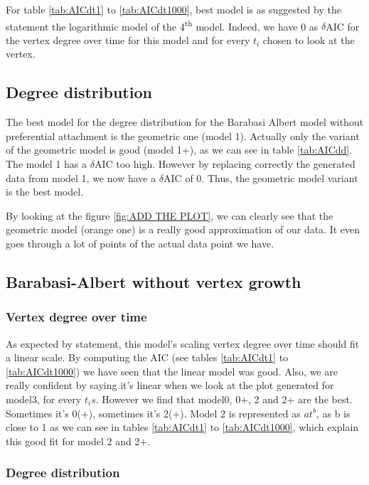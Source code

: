 \documentclass{article}
\begin{document}
For table \ref{tab:AICdt1} to \ref{tab:AICdt1000}, best model is as suggested by
the statement the logarithmic model of the 4\textsuperscript{th} model. Indeed,
we have 0 as $\delta$AIC for the vertex degree over time for this model and for every
$t_i$ chosen to look at the vertex.


\subsection{Degree distribution}


The best model for the degree distribution for the Barabasi Albert model without
preferential attachment is the geometric one (model 1). Actually only the
variant of the geometric model is good (model 1+), as we can see in table
\ref{tab:AICdd}. The model 1 has a $\delta$AIC too high. However by replacing
correctly the generated data from model 1, we now have a $\delta$AIC of 0.
Thus, the geometric model variant is the best model.

By looking at the figure \ref{fig:ADD THE PLOT}, we can clearly see that
the geometric model (orange one)
is a really good approximation of our data. It even goes through a lot of
points of the actual data point we have.



\subsection{Barabasi-Albert without vertex growth}

\subsubsection{Vertex degree over time}

As expected by statement, this model's scaling vertex degree over time should
fit a linear scale. By computing the AIC (see tables \ref{tab:AICdt1} to
\ref{tab:AICdt1000}) we have seen that the linear model was good. Also, we are
really confident by saying it's linear when we look at the plot generated for
model3, for every $t_is$. However we find that model0, 0+, 2 and 2+ are the
best. Sometimes it's 0(+), sometimes it's 2(+). Model 2 is represented as
$at^b$, as b is close to 1 as we can see in tables \ref{tab:AICdt1} to
\ref{tab:AICdt1000}, which explain this good fit for model 2 and 2+.

\subsubsection{Degree distribution}
\end{document}
